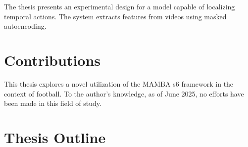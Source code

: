 The thesis presents an experimental design for a model capable of localizing temporal actions. The system extracts features from videos using masked autoencoding.

\section{Contributions}

This thesis explores a novel utilization of the MAMBA \acrshort{s6} framework in the context of football. To the author's knowledge, as of June 2025, no efforts have been made in this field of study. 

\section{Thesis Outline}

